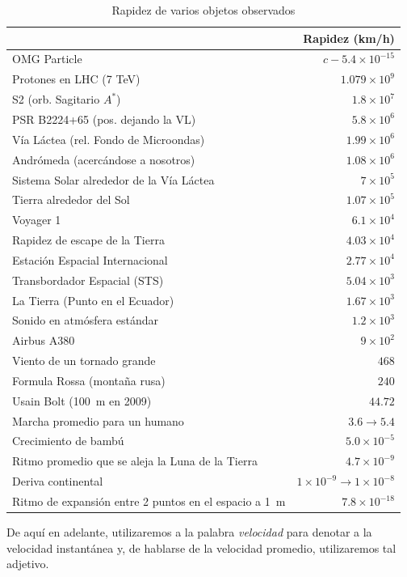 \begin{table}[ht]
\caption{Rapidez de varios objetos observados}
\begin{tabular}{l r}
\toprule
           & \textbf{Rapidez (\si{\kilo\meter/\hour})} \\
\midrule
OMG Particle & $c-5.4\times10^{-15}$\\
Protones en LHC (7 TeV) & $1.079\times10^{9}$\\
S2 (orb. Sagitario $A^*$) &  $1.8\times10^{7}$ \\
PSR B2224+65 (pos. dejando la VL)  &  $5.8\times10^{6}$  \\
V\'ia L\'actea (rel. Fondo de Microondas) & $1.99\times10^6$\\
Andr\'omeda (acerc\'andose a nosotros) & $1.08\times10^6$\\
Sistema Solar alrededor de la V\'ia L\'actea & $7\times10^5$\\
Tierra alrededor del Sol & $1.07\times10^5$\\
Voyager 1 & $6.1\times10^4$\\
Rapidez de escape de la Tierra & $4.03\times10^4$\\
Estaci\'on Espacial Internacional & $2.77\times10^4$\\
Transbordador Espacial (STS) & $5.04\times10^3$\\
La Tierra (Punto en el Ecuador) & $1.67\times10^3$\\
Sonido en atm\'osfera est\'andar & $1.2\times10^3$\\
Airbus A380 & $9\times10^2$\\
Viento de un tornado grande & $468$\\
Formula Rossa (monta\~na rusa) & $240$\\
Usain Bolt (\SI{100}{\meter} en 2009) & $44.72$\\
Marcha promedio para un humano & $3.6\to5.4$\\
Crecimiento de bamb\'u & $5.0\times10^{-5}$\\
Ritmo promedio que se aleja la Luna  de la Tierra & $4.7\times10^{-9}$ \\
Deriva continental & $1\times10^{-9}\to1\times10^{-8}$\\
Ritmo de expansi\'on entre 2 puntos en el espacio a \SI{1}{\meter} & $7.8\times10^{-18}$\\
\bottomrule
\end{tabular}
\label{table:vel2}
\end{table}

De aqu\'i en adelante, utilizaremos a la palabra \emph{velocidad} para denotar a la velocidad instant\'anea y, de hablarse de la velocidad promedio, utilizaremos tal adjetivo.

